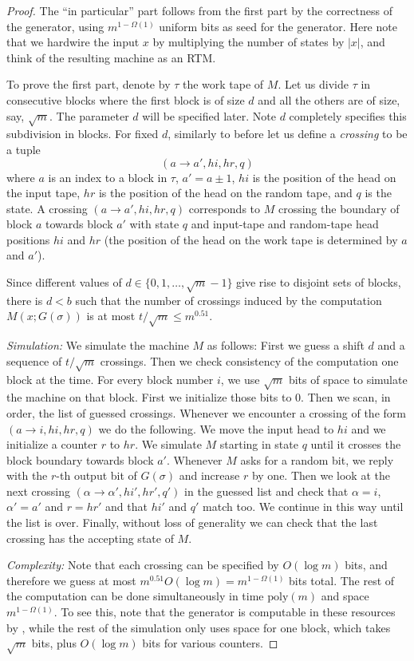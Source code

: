 \documentclass{toc}
\newcommand{\poly}{\mathrm{poly}}
\begin{document}
\begin{proof}
The ``in particular'' part follows from the first part by the correctness
of the generator, using $m^{1-\Omega(1)}$ uniform bits as seed for
the generator. Here note that we hardwire the input $x$ by multiplying
the number of states by $|x|$, and think of the resulting machine
as an RTM.

To prove the first part, denote by $\tau$ the work tape of $M$.
Let us divide $\tau$ in consecutive blocks where the first block
is of size $d$ and all the others are of size, say, $\sqrt{m}$.
The parameter $d$ will be specified later. Note $d$ completely specifies
this subdivision in blocks. For fixed $d$, similarly to before let
us define a \emph{crossing} to be a tuple 
\[
(a\rightarrow a',hi,hr,q)
\]
where $a$ is an index to a block in $\tau$, $a'=a\pm1$, $hi$ is
the position of the head on the input tape, $hr$ is the position
of the head on the random tape, and $q$ is the state. A crossing
$(a\rightarrow a',hi,hr,q)$ corresponds to $M$ crossing the boundary
of block $a$ towards block $a'$ with state $q$ and input-tape and
random-tape head positions $hi$ and $hr$ (the position of the head
on the work tape is determined by $a$ and $a'$).

Since different values of $d\in\{0,1,\ldots,\sqrt{m}-1\}$ give rise
to disjoint sets of blocks, there is $d<b$ such that the number of
crossings induced by the computation $M(x;G(\sigma))$ is at most
$t/\sqrt{m}\leq m^{0.51}$.

\emph{Simulation:} We simulate the machine $M$ as follows: First
we guess a shift $d$ and a sequence of $t/\sqrt{m}$ crossings. Then
we check consistency of the computation one block at the time. For
every block number $i$, we use $\sqrt{m}$ bits of space to simulate
the machine on that block. First we initialize those bits to $0$.
Then we scan, in order, the list of guessed crossings. Whenever we
encounter a crossing of the form $(a\rightarrow i,hi,hr,q)$ we do
the following. We move the input head to $hi$ and we initialize a
counter $r$ to $hr$. We simulate $M$ starting in state $q$ until
it crosses the block boundary towards block $a'$. Whenever $M$ asks
for a random bit, we reply with the $r$-th output bit of $G(\sigma)$
and increase $r$ by one. Then we look at the next crossing $(\alpha\rightarrow\alpha',hi',hr',q')$
in the guessed list and check that $\alpha=i$, $\alpha'=a'$ and
$r=hr'$ and that $hi'$ and $q'$ match too. We continue in this
way until the list is over. Finally, without loss of generality we
can check that the last crossing has the accepting state of $M$.

\emph{Complexity:} Note that each crossing can be specified by $O(\log m)$
bits, and therefore we guess at most $m^{0.51}O(\log m)=m^{1-\Omega(1)}$
bits total. The rest of the computation can be done simultaneously
in time $\poly(m)$ and space $m^{1-\Omega(1)}$. To see this, note
that the generator is computable in these resources by ,
while the rest of the simulation only uses space for one block, which
takes $\sqrt{m}$ bits, plus $O(\log m)$ bits for various counters.
\end{proof}
\end{document}
